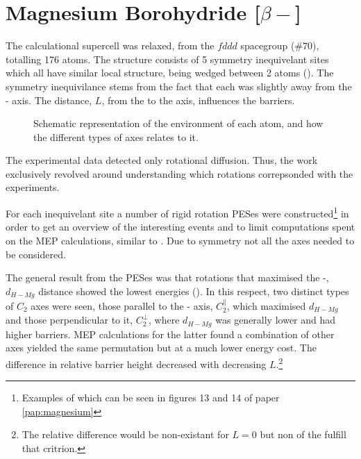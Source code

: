 \section{Magnesium Borohydride [$\beta-$]}
\label{sec:borohydrides-magnesium}

The calculational supercell was relaxed, from the $fddd$ spacegroup ($\#70$), totalling 176 atoms.
The structure consists of 5 symmetry inequivelant  sites which all have similar local structure, being wedged between 2  atoms ().
The symmetry inequivilance stems from the fact that each  was slightly away from the - axis.
The distance, $L$, from the  to the axis, influences the barriers.

\begin{figure}
\begin{center}
\caption{Schematic representation of the environment of each  atom, and how the different types of axes relates to it.
}
\label{fig:mg-local-structure}
\end{center}
\end{figure}

The experimental data detected only rotational diffusion.
Thus, the work exclusively revolved around understanding which rotations correpsonded with the experiments.

For each inequivelant site a number of rigid rotation PESes were constructed\footnote{Examples of which can be seen in figures 13 and 14 of paper \ref{pap:magnesium}} in order to get an overview of the interesting events and to limit computations spent on the MEP calculations, similar to .
Due to symmetry not all the axes needed to be considered.

The general result from the PESes was that rotations that maximised the -, $d_{H-Mg}$ distance showed the lowest energies ().
In this respect, two distinct types of $C_2$ axes were seen, those parallel to the - axis, $C_2^\parallel$, which maximised $d_{H-Mg}$ and those perpendicular to it, $C_2^\perp$, where $d_{H-Mg}$ was generally lower and had higher barriers.
MEP calculations for the latter found a combination of other axes yielded the same permutation but at a much lower energy cost.
The difference in relative barrier height decreased with decreasing $L$.\footnote{The relative difference would be non-existant for $L=0$ but non of the  fulfill that critrion.}

